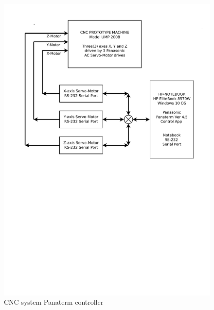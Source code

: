 \clearpage
\pagebreak

\begin{figure}
	\caption{CNC system Panaterm controller}
	\label{CNC-system-Panaterm-controller.pdf}
	\includegraphics[width=1.00\textwidth]{Appendix/Work-environment-setup/CNC-system-Panaterm-controller.pdf} 
	
\end{figure}

